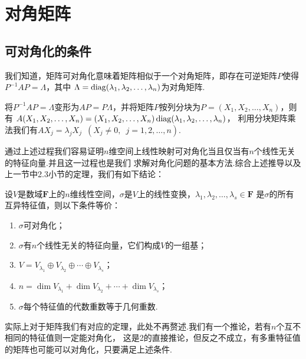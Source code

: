 \section{对角矩阵}
\subsection{可对角化的条件}
我们知道，矩阵可对角化意味着矩阵相似于一个对角矩阵，即存在可逆矩阵$P$使得$P^{-1}AP=\Lambda$，其中
$\Lambda=\operatorname{diag}(\lambda_1,\lambda_2,\ldots,\lambda_n)$为对角矩阵.

将$P^{-1}AP=\Lambda$变形为$AP=P\Lambda$，并将矩阵$P$按列分块为$P=(X_1,X_2,\ldots,X_n)$，则有
$A(X_1,X_2,\ldots,X_n)=(X_1,X_2,\ldots,X_n)\operatorname{diag}(\lambda_1,\lambda_2,\ldots,\lambda_n)$，
利用分块矩阵乘法我们有$AX_j=\lambda_jX_j\enspace(X_j\neq 0,\enspace j=1,2,\ldots,n)$.

通过上述过程我们容易证明$n$维空间上线性映射可对角化当且仅当有$n$个线性无关的特征向量.并且这一过程也是我们
求解对角化问题的基本方法.综合上述推导以及上一节中2.3小节的定理，我们有如下结论：
\begin{theorem}
    设$V$是数域$\mathbf{F}$上的$n$维线性空间，$\sigma$是$V$上的线性变换，$\lambda_1,\lambda_2,\ldots,\lambda_s\in\mathbf{F}$
    是$\sigma$的所有互异特征值，则以下条件等价：
    \begin{enumerate}
        \item $\sigma$可对角化；

        \item $\sigma$有$n$个线性无关的特征向量，它们构成$V$的一组基；

        \item $V=V_{\lambda_1}\oplus V_{\lambda_2}\oplus\cdots\oplus V_{\lambda_s}$；

        \item $n=\dim V_{\lambda_1}+\dim V_{\lambda_2}+\cdots+\dim V_{\lambda_s}$；

        \item $\sigma$每个特征值的代数重数等于几何重数.
    \end{enumerate}
\end{theorem}
实际上对于矩阵我们有对应的定理，此处不再赘述.我们有一个推论，若有$n$个互不相同的特征值则一定能对角化，
这是2的直接推论，但反之不成立，有多重特征值的矩阵也可能可以对角化，只要满足上述条件.

